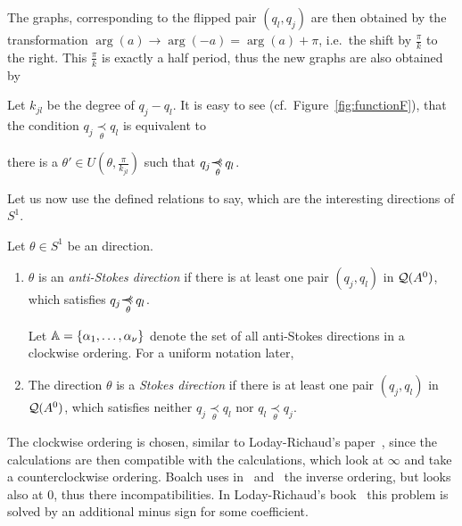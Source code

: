 The graphs, corresponding to the flipped pair $(q_l,q_j)$ are then obtained by
the transformation $\arg(a)\to\arg(-a)=\arg(a)+\pi$, i.e.\ the shift by
$\frac{\pi}{k}$ to the right. This $\frac{\pi}{k}$ is exactly a half period,
thus the new graphs are also obtained by 
\begin{rem}\label{rem:relationDistanceCondition}
  Let $k_{jl}$ be the degree of $q_j-q_l$.
  It is easy to see (cf.\ Figure~\ref{fig:functionF}), that the condition
  $q_j \underset{\theta}{\prec} q_l$ is equivalent to
  \begin{einr}
    there is a $\theta'\in U(\theta,\frac{\pi}{k_{jl}})$ such that
    $q_j\myrel{\theta}q_l$.
  \end{einr}
\end{rem}
Let us now use the defined relations to say, which are the interesting
directions of $S^1$.
\begin{defn}\label{defn:antiStokesDir}
  Let $\theta\in S^1$ be an direction.
  \begin{enumerate}
    \item $\theta$ is an \emph{anti-Stokes direction} if there is at least one
      pair $(q_j,q_l)$ in $\mathcal{Q}(A^0)$, which satisfies $q_j\myrel{\theta}q_l$.

      Let $\mathbb{A}=\{\alpha_1,\dots,\alpha_{\nu}\}$ denote the set of all
      anti-Stokes directions in a clockwise ordering. For a uniform
      notation later, 
    \item The direction $\theta$ is a \emph{Stokes direction} if there is at
      least one pair $(q_j,q_l)$ in $\mathcal{Q}(A^0)$, which satisfies neither
      $q_j\underset{\theta}{\prec} q_l$ nor $q_l\underset{\theta}{\prec} q_j$.
      \begin{comment}
        Let $\S=\{\sigma_1<\cdots<\sigma_\mu\}$ be the set of Stokes directions.
      \end{comment}
  \end{enumerate}
\end{defn}
The clockwise ordering is chosen, similar to Loday-Richaud's
paper~\cite{Loday1994}, since the calculations are then compatible with the
calculations, which look at $\infty$ and take a counterclockwise ordering.
Boalch uses in~\cite{boalch} and~\cite{thboalch} the inverse ordering, but looks
also at $0$, thus there  incompatibilities.
In Loday-Richaud's book~\cite{Loday2014} this problem is solved by an additional
minus sign for some coefficient.

